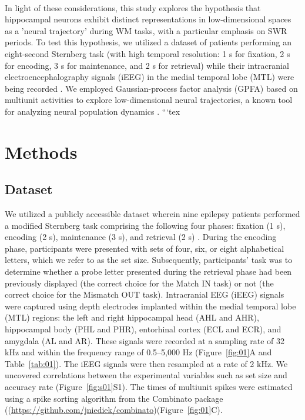 \documentclass[final,3p,times,twocolumn]{elsarticle}
\begin{document}
\\
\indent
In light of these considerations, this study explores the hypothesis that hippocampal neurons exhibit distinct representations in low-dimensional spaces as a 'neural trajectory' during WM tasks, with a particular emphasis on SWR periods. To test this hypothesis, we utilized a dataset of patients performing an eight-second Sternberg task (with high temporal resolution: 1 s for fixation, 2 s for encoding, 3 s for maintenance, and 2 s for retrieval) while their intracranial electroencephalography signals (iEEG) in the medial temporal lobe (MTL) were being recorded \cite{boran_dataset_2020}. We employed Gaussian-process factor analysis (GPFA) based on multiunit activities to explore low-dimensional neural trajectories, a known tool for analyzing neural population dynamics \cite{yu_gaussian-process_2009}.
\label{sec:introduction}```tex
\section{Methods}
\subsection{Dataset}
We utilized a publicly accessible dataset \cite{boran_dataset_2020} wherein nine epilepsy patients performed a modified Sternberg task comprising the following four phases: fixation (1 s), encoding (2 s), maintenance (3 s), and retrieval (2 s) \cite{boran_dataset_2020}. During the encoding phase, participants were presented with sets of four, six, or eight alphabetical letters, which we refer to as the set size. Subsequently, participants' task was to determine whether a probe letter presented during the retrieval phase had been previously displayed (the correct choice for the Match IN task) or not (the correct choice for the Mismatch OUT task). Intracranial EEG (iEEG) signals were captured using depth electrodes implanted within the medial temporal lobe (MTL) regions: the left and right hippocampal head (AHL and AHR), hippocampal body (PHL and PHR), entorhinal cortex (ECL and ECR), and amygdala (AL and AR). These signals were recorded at a sampling rate of 32 kHz and within the frequency range of 0.5--5,000 Hz (Figure~\ref{fig:01}A and Table~\ref{tab:01}). The iEEG signals were then resampled at a rate of 2 kHz. We uncovered correlations between the experimental variables such as set size and accuracy rate (Figure~\ref{fig:s01}S1). The times of multiunit spikes were estimated using a spike sorting algorithm \cite{niediek_reliable_2016} from the Combinato package ((\url{https://github.com/jniediek/combinato})(Figure~\ref{fig:01}C).
\end{document}
